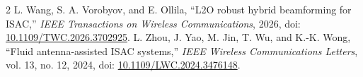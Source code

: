 \documentclass[11pt]{article}
\begin{document}
\begin{thebibliography}{2}
L. Wang, S. A. Vorobyov, and E. Ollila,
``L2O robust hybrid beamforming for ISAC,''
\emph{IEEE Transactions on Wireless Communications}, 2026,
doi: \href{https://doi.org/10.1109/TWC.2026.3702925}{10.1109/TWC.2026.3702925}.
L. Zhou, J. Yao, M. Jin, T. Wu, and K.-K. Wong,
``Fluid antenna-assisted ISAC systems,''
\emph{IEEE Wireless Communications Letters}, vol. 13, no. 12, 2024,
doi: \href{https://doi.org/10.1109/LWC.2024.3476148}{10.1109/LWC.2024.3476148}.
\end{thebibliography}
\end{document}
